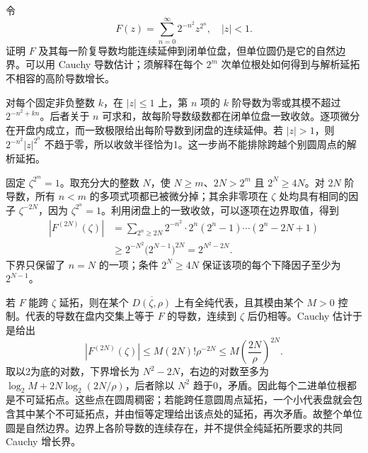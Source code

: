 \begin{exercise}\label{b3:ex:09-6}
令
\[
 F(z)=\sum_{n=0}^{\infty}2^{-n^2}z^{2^n},\quad |z|<1.
\]
证明 \(F\) 及其每一阶复导数均能连续延伸到闭单位盘，但单位圆仍是它的自然边界。可以用 Cauchy 导数估计；须解释在每个 \(2^m\) 次单位根处如何得到与解析延拓不相容的高阶导数增长。
\end{exercise}
\begin{solution}
对每个固定非负整数 \(k\)，在 \(|z|\le1\) 上，第 \(n\) 项的 \(k\) 阶导数为零或其模不超过 \(2^{-n^2+kn}\)。后者关于 \(n\) 可求和，故每阶导数级数都在闭单位盘一致收敛。逐项微分在开盘内成立，而一致极限给出每阶导数到闭盘的连续延伸。若 \(|z|>1\)，则 \(2^{-n^2}|z|^{2^n}\) 不趋于零，所以收敛半径恰为1。这一步尚不能排除跨越个别圆周点的解析延拓。

固定 \(\zeta^{2^m}=1\)。取充分大的整数 \(N\)，使 \(N\ge m\)、\(2N>2^m\) 且 \(2^N\ge4N\)。对 \(2N\) 阶导数，所有 \(n<m\) 的多项式项都已被微分掉；其余非零项在 \(\zeta\) 处均具有相同的因子 \(\zeta^{-2N}\)，因为 \(\zeta^{2^n}=1\)。利用闭盘上的一致收敛，可以逐项在边界取值，得到
\[
 \begin{aligned}
 |F^{(2N)}(\zeta)|
 &=\sum_{2^n\ge2N}2^{-n^2}
      \cdot2^n(2^n-1)\cdots(2^n-2N+1)\\
 &\ge2^{-N^2}\bigl(2^{N-1}\bigr)^{2N}
 =2^{N^2-2N}.
 \end{aligned}
\]
下界只保留了 \(n=N\) 的一项；条件 \(2^N\ge4N\) 保证该项的每个下降因子至少为 \(2^{N-1}\)。

若 \(F\) 能跨 \(\zeta\) 延拓，则在某个 \(\overline{D(\zeta,\rho)}\) 上有全纯代表，且其模由某个 \(M>0\) 控制。代表的导数在盘内交集上等于 \(F\) 的导数，连续到 \(\zeta\) 后仍相等。Cauchy 估计于是给出
\[
 |F^{(2N)}(\zeta)|
 \le M(2N)!\rho^{-2N}
 \le M\left(\frac{2N}{\rho}\right)^{2N}.
\]
取以2为底的对数，下界增长为 \(N^2-2N\)，右边的对数至多为 \(\log_2M+2N\log_2(2N/\rho)\)，后者除以 \(N^2\) 趋于0，矛盾。因此每个二进单位根都是不可延拓点。这些点在圆周稠密；若能跨任意圆周点延拓，一个小代表盘就会包含其中某个不可延拓点，并由恒等定理给出该点处的延拓，再次矛盾。故整个单位圆是自然边界。边界上各阶导数的连续存在，并不提供全纯延拓所要求的共同 Cauchy 增长界。
\end{solution}

